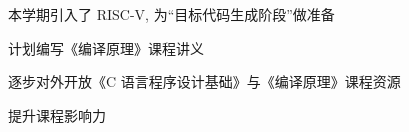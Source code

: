 \begin{frame}{}
  \begin{center}

    \vspace{0.30cm}
    本学期引入了 RISC-V, 为``目标代码生成阶段''做准备
  \end{center}
\end{frame}

\begin{frame}{}
  \begin{center}
    计划编写《编译原理》课程讲义

    \vspace{0.80cm}
    逐步对外开放《C 语言程序设计基础》与《编译原理》课程资源

    \vspace{0.30cm}
    提升课程影响力
  \end{center}
\end{frame}
